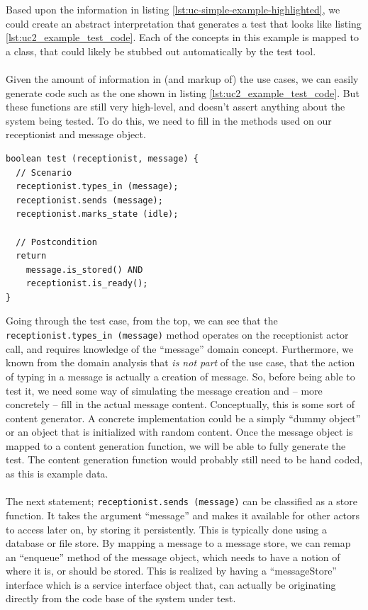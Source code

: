 Based upon the information in listing \ref{lst:uc-simple-example-highlighted}, we could create an abstract interpretation that generates a test that looks like listing \ref{lst:uc2_example_test_code}.
Each of the concepts in this example is mapped to a class, that could likely be stubbed out automatically by the test tool.\\\\
Given the amount of information in (and markup of) the use cases, we can easily generate code such as the one shown in listing \ref{lst:uc2_example_test_code}. But these functions are still very high-level, and doesn't assert anything about the system being tested. To do this, we need to fill in the methods used on our receptionist and message object.
\begin{lstlisting}[caption=Suggestion of generated test case,label={lst:uc2_example_test_code}]
boolean test (receptionist, message) {
  // Scenario
  receptionist.types_in (message);
  receptionist.sends (message);
  receptionist.marks_state (idle);
  
  // Postcondition
  return
    message.is_stored() AND
    receptionist.is_ready();
}
\end{lstlisting}
Going through the test case, from the top, we can see that the \texttt{receptionist.types\_in~(message)} method operates on the receptionist actor call, and requires knowledge of the ``message'' domain concept. Furthermore, we known from the domain analysis that \emph{is not part} of the use case, that the action of typing in a message is actually a creation of message. So, before being able to test it, we need some way of simulating the message creation and -- more concretely -- fill in the actual message content. Conceptually, this is some sort of content generator. A concrete implementation could be a simply ``dummy object'' or an object that is initialized with random content. Once the message object is mapped to a content generation function, we will be able to fully generate the test. The content generation function would probably still need to be hand coded, as this is example data.\\\\
The next statement; \texttt{receptionist.sends (message)} can be classified as a store function. It takes the argument ``message'' and makes it available for other actors to access later on, by storing it persistently. This is typically done using a database or file store. By mapping a message to a message store, we can remap an ``enqueue'' method of the message object, which needs to have a notion of where it is, or should be stored. This is realized by having a ``messageStore'' interface which is a service interface object that, can actually be originating directly from the code base of the system under test.\\\\

